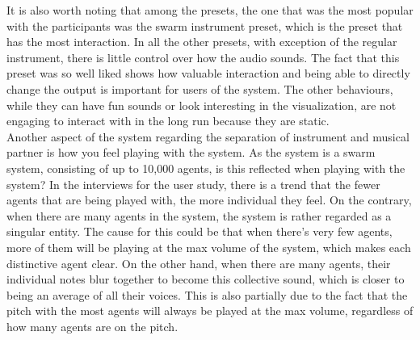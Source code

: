 \documentclass[a4paper,english]{report}
\begin{document}
	It is also worth noting that among the presets, the one that was the most popular with the participants was the swarm instrument preset, which is the preset that has the most interaction. In all the other presets, with exception of the regular instrument, there is little control over how the audio sounds. The fact that this preset was so well liked shows how valuable interaction and being able to directly change the output is important for users of the system. The other behaviours, while they can have fun sounds or look interesting in the visualization, are not engaging to interact with in the long run because they are static.\\
	Another aspect of the system regarding the separation of instrument and musical partner is how you feel playing with the system. As the system is a swarm system, consisting of up to 10,000 agents, is this reflected when playing with the system? In the interviews for the user study, there is a trend that the fewer agents that are being played with, the more individual they feel. On the contrary, when there are many agents in the system, the system is rather regarded as a singular entity. The cause for this could be that when there's very few agents, more of them will be playing at the max volume of the system, which makes each distinctive agent clear. On the other hand, when there are many agents, their individual notes blur together to become this collective sound, which is closer to being an average of all their voices. This is also partially due to the fact that the pitch with the most agents will always be played at the max volume, regardless of how many agents are on the pitch.
	
\end{document}
